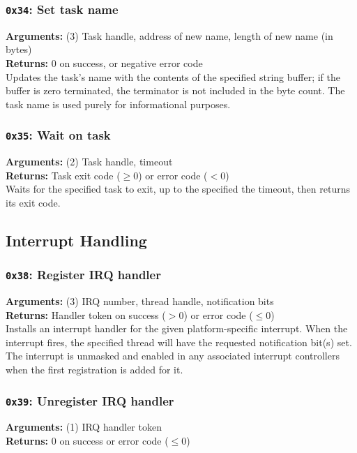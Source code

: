 \documentclass[11pt]{article}
\begin{document}
\subsubsection{{\tt 0x34}: Set task name}
\textbf{Arguments:} (3) Task handle, address of new name, length of new name (in bytes) \\
\textbf{Returns:} 0 on success, or negative error code \\

Updates the task's name with the contents of the specified string buffer; if the buffer is zero terminated, the terminator is not included in the byte count. The task name is used purely for informational purposes.

\subsubsection{{\tt 0x35}: Wait on task}
\textbf{Arguments:} (2) Task handle, timeout \\
\textbf{Returns:} Task exit code ($\geq0$) or error code ($<0$) \\

Waits for the specified task to exit, up to the specified the timeout, then returns its exit code.



\newpage
\subsection{Interrupt Handling}

\subsubsection{{\tt 0x38}: Register IRQ handler}
\textbf{Arguments:} (3) IRQ number, thread handle, notification bits \\
\textbf{Returns:} Handler token on success ($> 0$) or error code ($\leq0$) \\

Installs an interrupt handler for the given platform-specific interrupt. When the interrupt fires, the specified thread will have the requested notification bit(s) set. The interrupt is unmasked and enabled in any associated interrupt controllers when the first registration is added for it.

\subsubsection{{\tt 0x39}: Unregister IRQ handler}
\textbf{Arguments:} (1) IRQ handler token \\
\textbf{Returns:} 0 on success or error code ($\leq0$) \\
\end{document}
